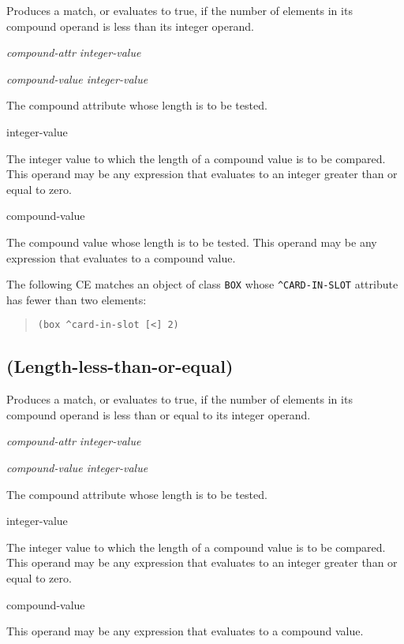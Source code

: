 Produces a match, or evaluates to true, if the number of elements in
its compound operand is less than its integer operand.

\Format

\ct\it{compound-attr} \co{[<]} \it{integer-value}

\it{compound-value} \co{[<]} \it{integer-value}

\begin{operands}
\item[\ct{compound-attr}]

  The compound attribute whose length is to be tested.

\item[integer-value]

  The integer value to which the length of a compound value is to be
  compared. This operand may be any expression that evaluates to an
  integer greater than or equal to zero.

\item[compound-value]

  The compound value whose length is to be tested. This operand may be
  any expression that evaluates to a compound value.
\end{operands}

\Example

The following CE matches an object of class \verb|BOX| whose
\verb|^CARD-IN-SLOT| attribute has fewer than two elements:

\begin{quote}
\begin{verbatim}
(box ^card-in-slot [<] 2)
\end{verbatim}
\end{quote}

\subsection{\co{[<=]} (Length-less-than-or-equal)}

Produces a match, or evaluates to true, if the number of elements in
its compound operand is less than or equal to its integer operand.

\Format

\ct\it{compound-attr} \co{[<=]} \it{integer-value}

\it{compound-value} \co{[<=]} \it{integer-value}

\begin{operands}
\item[\ct{compound-attr}]

  The compound attribute whose length is to be tested.

\item[integer-value]

  The integer value to which the length of a compound value is to be
  compared. This operand may be any expression that evaluates to an
  integer greater than or equal to zero.

\item[compound-value]

  This operand may be any expression that evaluates to a compound
  value.
\end{operands}

